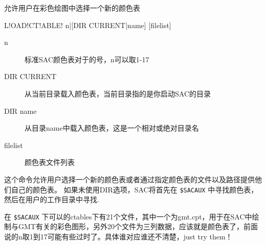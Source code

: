 \label{cmd:loadctable}

允许用户在彩色绘图中选择一个新的颜色表

\begin{SACSTX}
L!OAD!CT!ABLE! n|[DIR CURRENT|name] [filelist]
\end{SACSTX}

\begin{description}
\item [n] 标准SAC颜色表对于的号，n可以取1-17
\item [DIR CURRENT] 从当前目录载入颜色表，当前目录指的是你启动SAC的目录
\item [DIR name] 从目录name中载入颜色表，这是一个相对或绝对目录名
\item [filelist] 颜色表文件列表
\end{description}

这个命令允许用户选择一个新的颜色表或者通过指定颜色表的文件以及路径提供他们自己的颜色表。
如果未使用DIR选项，SAC将首先在 \verb|$SACAUX| 中寻找颜色表，然后在用户的工作目录中寻找.

在 \verb|$SACAUX| 下可以的ctables下有21个文件，其中一个为gmt.cpt，用于在SAC中绘制与GMT有关的彩色图形，另外20个文件为三列数据，应该就是颜色表了，前面说的n取1到17可能有些过时了。具体谁对应谁还不清楚，just try them！
